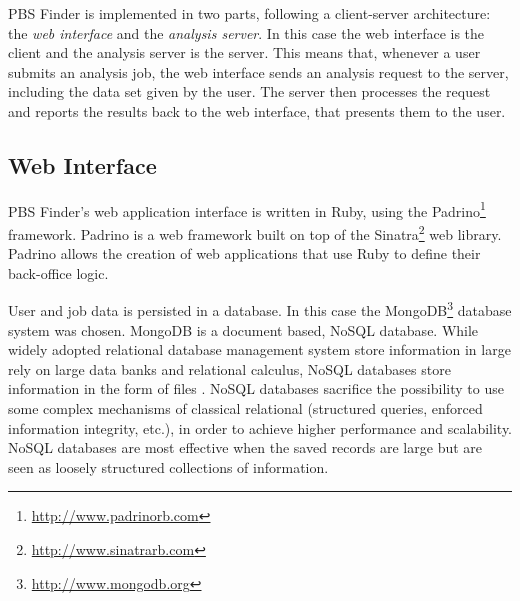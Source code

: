 
PBS Finder is implemented in two parts, following a client-server architecture:
the \emph{web interface} and the \emph{analysis server}. In this case the web
interface is the client and the analysis server is the server. This means that,
whenever a user submits an analysis job, the web interface sends an analysis
request to the server, including the data set given by the user. The server then
processes the request and reports the results back to the web interface, that
presents them to the user.

\subsection{Web Interface}

PBS Finder's web application interface is written in Ruby, using the
Padrino\footnote{\url{http://www.padrinorb.com}} framework. Padrino is a web
framework built on top of the Sinatra\footnote{\url{http://www.sinatrarb.com}}
web library. Padrino allows the creation of web applications that use Ruby to
define their back-office logic.

User and job data is persisted in a database. In this case the
MongoDB\footnote{\url{http://www.mongodb.org}} database system was chosen.
MongoDB is a document based, NoSQL database. While widely adopted relational
database management system store information in large rely on large data banks
and relational calculus, NoSQL databases store information in the form of files
\cite{strauch2011nosql}. NoSQL databases sacrifice the possibility to use some
complex mechanisms of classical relational (structured queries, enforced
information integrity, etc.), in order to achieve higher performance and
scalability. NoSQL databases are most effective when the saved records are large
but are seen as loosely structured collections of information.

